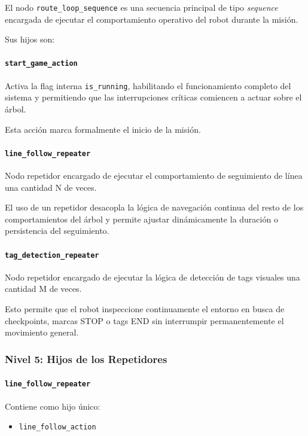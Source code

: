 \documentclass{prgrado}
\begin{document}
El nodo \texttt{route\_loop\_sequence} es una secuencia principal de tipo \textit{sequence} encargada de ejecutar el comportamiento operativo del robot durante la misión.

Sus hijos son:

\paragraph{\texttt{start\_game\_action}}

Activa la flag interna \texttt{is\_running}, habilitando el funcionamiento completo del sistema y permitiendo que las interrupciones críticas comiencen a actuar sobre el árbol.

Esta acción marca formalmente el inicio de la misión.

\paragraph{\texttt{line\_follow\_repeater}}

Nodo repetidor encargado de ejecutar el comportamiento de seguimiento de línea una cantidad N de veces.

El uso de un repetidor desacopla la lógica de navegación continua del resto de los comportamientos del árbol y permite ajustar dinámicamente la duración o persistencia del seguimiento.

\paragraph{\texttt{tag\_detection\_repeater}}

Nodo repetidor encargado de ejecutar la lógica de detección de tags visuales una cantidad M de veces.

Esto permite que el robot inspeccione continuamente el entorno en busca de checkpoints, marcas STOP o tags END sin interrumpir permanentemente el movimiento general.

\subsubsection{Nivel 5: Hijos de los Repetidores}

\paragraph{\texttt{line\_follow\_repeater}}

Contiene como hijo único:

\begin{itemize}
    \item \texttt{line\_follow\_action}
\end{itemize}
\end{document}
